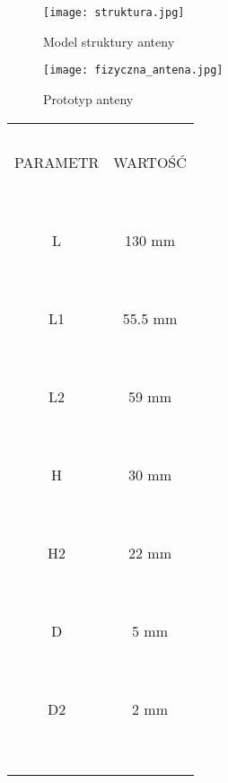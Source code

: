 \begin{figure}[h!]
	\centering
	    \texttt{[image: struktura.jpg]}
	    \caption{Model struktury anteny}
\end{figure}


\begin{figure}[h!]
	\centering
	    \texttt{[image: fizyczna\_antena.jpg]}
	    \caption{Prototyp anteny}
\end{figure}

\begin{table}[h]
\begin{center}
    \begin{tabular}{|c|c|}
    \hline
    ~                 & ~       \\
    PARAMETR          & WARTOŚĆ \\
    ~                 & ~       \\ \hline
    ~                 & ~       \\
    L                 & 130 mm  \\
    ~                 & ~       \\ \hline
    ~                 & ~       \\
    L1                & 55.5 mm \\
    ~                 & ~       \\ \hline
    ~                 & ~       \\
    L2                & 59 mm   \\
    ~                 & ~       \\ \hline
    ~                 & ~       \\
    H                 & 30 mm   \\
    ~                 & ~       \\ \hline
    ~                 & ~       \\
    H2                & 22 mm   \\
    ~                 & ~       \\ \hline
    ~                 & ~       \\
    D                 & 5 mm    \\
    ~                 & ~       \\ \hline
    ~                 & ~       \\
    D2                & 2 mm    \\
    ~                 & ~       \\ \hline
    ~                 & ~       \\

\end{tabular}
\end{center}
\end{table}
